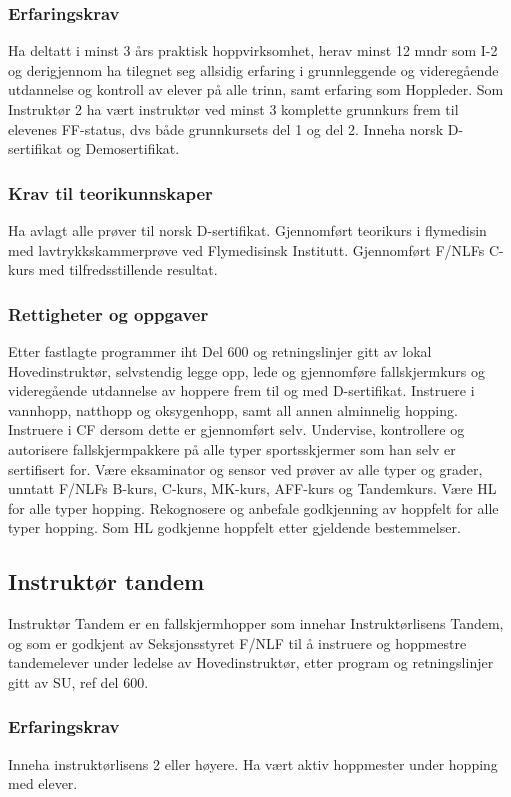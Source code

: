 \subsubsection{Erfaringskrav}
Ha deltatt i minst 3 års praktisk hoppvirksomhet, herav minst 12 mndr som I-2 og derigjennom ha tilegnet seg allsidig erfaring i grunnleggende og videregående utdannelse og kontroll av elever på alle trinn, samt erfaring som Hoppleder. Som Instruktør 2 ha vært instruktør ved minst 3 komplette grunnkurs frem til elevenes FF-status, dvs både grunnkursets del 1 og del 2. Inneha norsk D-sertifikat og Demosertifikat.

\subsubsection{Krav til teorikunnskaper}
Ha avlagt alle prøver til norsk D-sertifikat. Gjennomført teorikurs i flymedisin med lavtrykkskammerprøve ved Flymedisinsk Institutt. Gjennomført F/NLFs C-kurs med tilfredsstillende resultat.

\subsubsection{Rettigheter og oppgaver}
Etter fastlagte programmer iht Del 600 og retningslinjer gitt av lokal Hovedinstruktør, selvstendig legge opp, lede og gjennomføre fallskjermkurs og videregående utdannelse av hoppere frem til og med D-sertifikat. Instruere i vannhopp, natthopp og oksygenhopp, samt all annen alminnelig hopping. Instruere i CF dersom dette er gjennomført selv. Undervise, kontrollere og autorisere fallskjermpakkere på alle typer sportsskjermer som han selv er sertifisert for. Være eksaminator og sensor ved prøver av alle typer og grader, unntatt F/NLFs B-kurs, C-kurs, MK-kurs, AFF-kurs og Tandemkurs. Være HL for alle typer hopping. Rekognosere og anbefale godkjenning av hoppfelt for alle typer hopping. Som HL godkjenne hoppfelt etter gjeldende bestemmelser.

\subsection{Instruktør tandem}
Instruktør Tandem er en fallskjermhopper som innehar Instruktørlisens Tandem, og som er godkjent av Seksjonsstyret F/NLF til å instruere og hoppmestre tandemelever under ledelse av Hovedinstruktør, etter program og retningslinjer gitt av SU, ref del 600.

\subsubsection{Erfaringskrav}
Inneha instruktørlisens 2 eller høyere. Ha vært aktiv hoppmester under hopping med elever.


